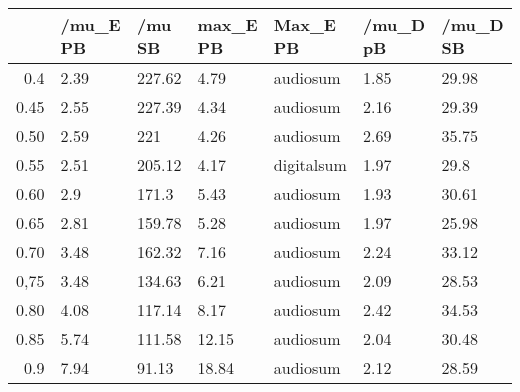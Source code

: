 \begin{table}[ht]
\centering
\begin{tabular}{rllllll}
  \hline
 & /mu\_E PB & /mu SB & max\_E PB & Max\_E PB & /mu\_D pB & /mu\_D SB \\ 
  \hline
0.4 & 2.39 & 227.62 & 4.79 & audiosum & 1.85 & 29.98 \\ 
  0.45 & 2.55 & 227.39 & 4.34 & audiosum & 2.16 & 29.39 \\ 
  0.50 & 2.59 & 221 & 4.26 & audiosum & 2.69 & 35.75 \\ 
  0.55 & 2.51 & 205.12 & 4.17 & digitalsum & 1.97 & 29.8 \\ 
  0.60 & 2.9 & 171.3 & 5.43 & audiosum & 1.93 & 30.61 \\ 
  0.65 & 2.81 & 159.78 & 5.28 & audiosum & 1.97 & 25.98 \\ 
  0.70 & 3.48 & 162.32 & 7.16 & audiosum & 2.24 & 33.12 \\ 
  0,75 & 3.48 & 134.63 & 6.21 & audiosum & 2.09 & 28.53 \\ 
  0.80 & 4.08 & 117.14 & 8.17 & audiosum & 2.42 & 34.53 \\ 
  0.85 & 5.74 & 111.58 & 12.15 & audiosum & 2.04 & 30.48 \\ 
  0.9 & 7.94 & 91.13 & 18.84 & audiosum & 2.12 & 28.59 \\ 
   \hline
\end{tabular}
\end{table}
